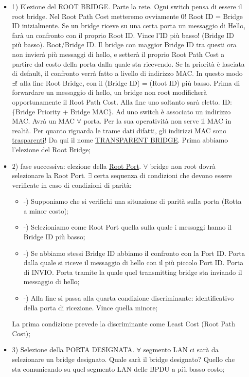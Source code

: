 \begin{itemize}

\item{1)} Elezione del ROOT BRIDGE. Parte la rete. Ogni switch pensa di essere il root bridge. Nel Root Path Cost metteremo ovviamente 0! Root ID = Bridge ID inizialmente. Se un bridge riceve su una certa porta un messaggio di Hello, farà un confronto con il proprio Root ID. Vince l'ID più basso! (Bridge ID più basso). Root/Bridge ID. Il bridge con maggior Bridge ID tra questi ora non invierà più messaggi di hello, e setterà il proprio Root Path Cost a partire dal costo della porta dalla quale sta ricevendo. Se la priorità è lasciata di default, il confronto verrà fatto a livello di indirizzo MAC. In questo modo $\exists!$ alla fine Root Bridge, con il (Bridge ID) = (Root ID) più basso. Prima di forwardare un messaggio di hello, un bridge non root modificherà opportunamente il Root Path Cost. Alla fine uno soltanto sarà eletto. ID: \{Bridge Priority + Bridge MAC\}. Ad uno switch è associato un indirizzo MAC. Avrà un MAC $\forall$ porta. Per la sua operatività non serve il MAC in realtà. Per quanto riguarda le trame dati difatti, gli indirizzi MAC sono \underline{trasparenti}! Da qui il nome \underline{\underline{TRANSPARENT BRIDGE}}. Prima abbiamo l'elezione del \underline{Root Bridge};

\item{2)} fase successiva: elezione della \underline{Root Port}. $\forall$ bridge non root dovrà selezionare la Root Port. $\exists$ certa sequenza di condizioni che devono essere verificate in caso di condizioni di parità:

\begin{itemize}

\item{-)} Supponiamo che si verifichi una situazione di parità sulla porta (Rotta a minor costo);
\item{-)} Selezioniamo come Root Port quella sulla quale i messaggi hanno il Bridge ID più basso;
\item{-)} Se abbiamo stessi Bridge ID abbiamo il confronto con la Port ID. Porta dalla quale si riceve il messaggio di hello con il più piccolo Port ID. Porta di INVIO. Porta tramite la quale quel transmitting bridge sta inviando il messaggio di hello;
\item{-)} Alla fine si passa alla quarta condizione discriminante: identificativo della porta di ricezione. Vince quella minore;
\end{itemize}

La prima condizione prevede la discriminante come Least Cost (Root Path Cost);

\item{3)} Selezione della PORTA DESIGNATA. $\forall$ segmento LAN ci sarà da selezionare un bridge designato. Quale sarà il bridge designato? Quello che sta comunicando su quel segmento LAN delle BPDU a più basso costo;

\end{itemize}

